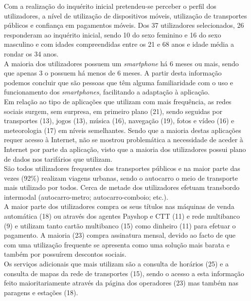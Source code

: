 Com a realização do inquérito inicial pretendeu-se perceber o perfil dos utilizadores, a nível de utilização de dispositivos móveis, utilização de transportes públicos e confiança em pagamentos móveis. Dos 37 utilizadores selecionados, 26 responderam ao inquérito inicial, sendo 10 do sexo feminino e 16 do sexo masculino e com idades compreendidas entre os 21 e 68 anos e idade média a rondar os 34 anos.
\\A maioria dos utilizadores possuem um \emph{smartphone} há 6 meses ou mais, sendo que apenas 3 o possuem há menos de 6 meses. A partir desta informação podemos concluir que são pessoas que têm alguma familiaridade com o uso e funcionamento dos \emph{smartphones}, facilitando a adaptação à aplicação.
\\Em relação ao tipo de aplicações que utilizam com mais frequência, as redes sociais surgem, sem surpresa, em primeiro plano (21), sendo seguidas por transportes (13), jogos (13), música (16), navegação (19), fotos e vídeo (16) e meteorologia (17) em níveis semelhantes. Sendo que a maioria destas aplicações requer acesso à Internet, não se mostrou problemática a necessidade de aceder à Internet por parte da aplicação, visto que a maioria dos utilizadores possui plano de dados nos tarifários que utilizam.
\\São todos utilizadores frequentes dos transportes públicos e na maior parte das vezes (92\%) realizam viagens urbanas, sendo o autocarro o meio de transporte mais utilizado por todos. Cerca de metade dos utilizadores efetuam transbordo intermodal (autocarro-metro; autocarro-comboio; etc.).
\\A maior parte dos utilizadores compra os seus títulos nas máquinas de venda automática (18) ou através dos agentes Payshop e CTT (11) e rede multibanco (9) e utilizam tanto cartão multibanco (15) como dinheiro (11) para efetuar o pagamento. A maioria (23) compra assinatura mensal, devido ao facto de que com uma utilização frequente se apresenta como uma solução mais barata e também por possuírem descontos sociais.
\\Os serviços adicionais que mais utilizam são a consulta de horários (25) e a consulta de mapas da rede de transportes (15), sendo o acesso a esta informação feito maioritariamente através da página \web dos operadores (23) mas também nas paragens e estações (18).

